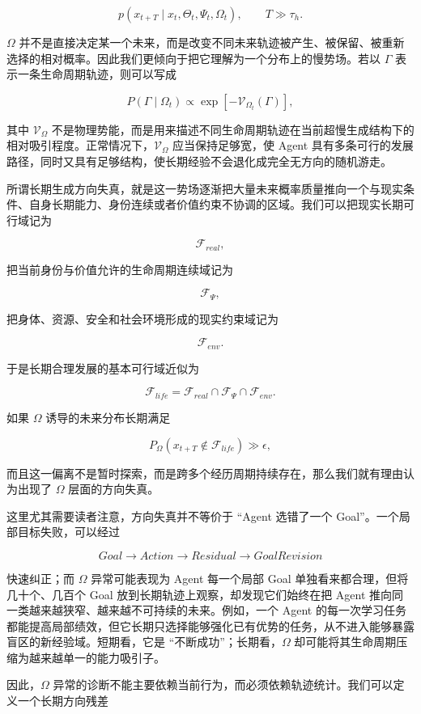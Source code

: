 \[
p(x_{t+T}\mid x_t,\Theta_t,\Psi_t,\Omega_t),
\qquad
T \gg \tau_h .
\]

$\Omega$ 并不是直接决定某一个未来，而是改变不同未来轨迹被产生、被保留、被重新选择的相对概率。因此我们更倾向于把它理解为一个分布上的慢势场。若以 $\Gamma$ 表示一条生命周期轨迹，则可以写成

\[
P(\Gamma\mid \Omega_t)
\propto
\exp
\left[
-\mathcal V_{\Omega_t}(\Gamma)
\right],
\]

其中 $\mathcal V_{\Omega}$ 不是物理势能，而是用来描述不同生命周期轨迹在当前超慢生成结构下的相对吸引程度。正常情况下，$\mathcal V_{\Omega}$ 应当保持足够宽，使 Agent 具有多条可行的发展路径，同时又具有足够结构，使长期经验不会退化成完全无方向的随机游走。

所谓长期生成方向失真，就是这一势场逐渐把大量未来概率质量推向一个与现实条件、自身长期能力、身份连续或者价值约束不协调的区域。我们可以把现实长期可行域记为

\[
\mathcal F_{real},
\]

把当前身份与价值允许的生命周期连续域记为

\[
\mathcal F_{\Psi},
\]

把身体、资源、安全和社会环境形成的现实约束域记为

\[
\mathcal F_{env}.
\]

于是长期合理发展的基本可行域近似为

\[
\mathcal F_{life}
=
\mathcal F_{real}
\cap
\mathcal F_{\Psi}
\cap
\mathcal F_{env}.
\]

如果 $\Omega$ 诱导的未来分布长期满足

\[
P_{\Omega}
\left(
x_{t+T}\notin\mathcal F_{life}
\right)
\gg
\epsilon,
\]

而且这一偏离不是暂时探索，而是跨多个经历周期持续存在，那么我们就有理由认为出现了 $\Omega$ 层面的方向失真。

这里尤其需要读者注意，方向失真并不等价于 ``Agent 选错了一个 Goal''。一个局部目标失败，可以经过

\[
Goal
\rightarrow
Action
\rightarrow
Residual
\rightarrow
GoalRevision
\]

快速纠正；而 $\Omega$ 异常可能表现为 Agent 每一个局部 Goal 单独看来都合理，但将几十个、几百个 Goal 放到长期轨迹上观察，却发现它们始终在把 Agent 推向同一类越来越狭窄、越来越不可持续的未来。例如，一个 Agent 的每一次学习任务都能提高局部绩效，但它长期只选择能够强化已有优势的任务，从不进入能够暴露盲区的新经验域。短期看，它是 ``不断成功''；长期看，$\Omega$ 却可能将其生命周期压缩为越来越单一的能力吸引子。

因此，$\Omega$ 异常的诊断不能主要依赖当前行为，而必须依赖轨迹统计。我们可以定义一个长期方向残差

